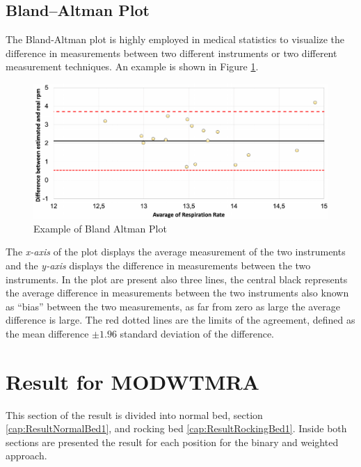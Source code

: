 \subsection{Bland–Altman Plot} \label{cap:plottino}
The Bland-Altman plot is highly employed in medical statistics to visualize the difference in measurements between two different instruments or two different measurement techniques. An example is shown in Figure \ref{fig:exxampleBland}.

\vspace{1cm}
\begin{figure}[H]
  \centering
  \includegraphics[width=\textwidth]{img/balnd1.pdf}
  \caption{Example of Bland Altman Plot}
  \label{fig:exxampleBland}
\end{figure}
\vspace{1cm}

The \textit{x-axis} of the plot displays the average measurement of the two instruments and the \textit{y-axis} displays the difference in measurements between the two instruments. In the plot are present also three lines, the central black represents the average difference in measurements between the two instruments also known as ``bias'' between the two measurements, as far from zero as large the average difference is large. The red dotted lines are the limits of the agreement, defined as the mean difference $\pm 1.96$ standard deviation of the difference. 




\clearpage
\section{Result for MODWTMRA} \label{cap:ResultMODWTRA}


This section of the result is divided into normal bed, section \ref{cap:ResultNormalBed1}, and rocking bed \ref{cap:ResultRockingBed1}. Inside both sections are presented the result for each position for the binary and weighted approach.

